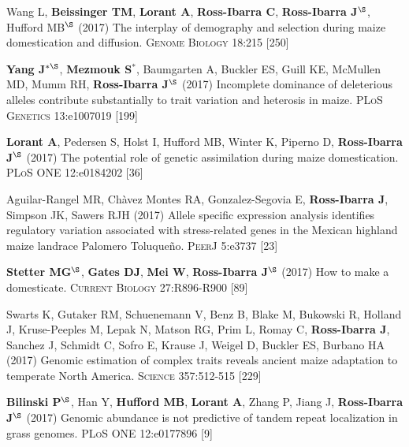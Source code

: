 \documentclass[letterpaper,10pt]{article}
\begin{document}
\begin{etaremune}
\item Wang L, \textbf{Beissinger TM}, \textbf{Lorant A}, \textbf{Ross-Ibarra C}, \textbf{Ross-Ibarra J}$^\S$, Hufford MB$^\S$ (2017) The interplay of demography and selection during maize domestication and diffusion. \textsc{Genome Biology} 18:215
{} [250]\\

\item {\bf Yang J}$^{*\S}$, {\bf Mezmouk S}$^*$, Baumgarten A, Buckler ES, Guill KE, McMullen MD, Mumm RH, {\bf Ross-Ibarra J}$^\S$ (2017) Incomplete dominance of deleterious alleles contribute substantially to trait variation and heterosis in maize. \textsc{PLoS Genetics} 13:e1007019
{} [199]\\

\item \textbf{Lorant A}, Pedersen S, Holst I, Hufford MB, Winter K, Piperno D, \textbf{Ross-Ibarra J}$^\S$ (2017) The potential role of genetic assimilation during maize domestication. \textsc{PLoS ONE} 12:e0184202
{} [36]\\

\item Aguilar-Rangel MR, Ch\`{a}vez Montes RA,  Gonzalez-Segovia E, \textbf{Ross-Ibarra J}, Simpson JK, Sawers RJH (2017) Allele specific expression analysis identifies regulatory variation associated with stress-related genes in the Mexican highland maize landrace Palomero Toluque\~{n}o. \textsc{PeerJ} 5:e3737
{} [23]\\

\item   {\bf Stetter MG}$^\S$, {\bf Gates DJ}, {\bf Mei W}, {\bf Ross-Ibarra J}$^\S$ (2017) How to make a domesticate. \textsc{Current Biology} 27:R896-R900
{} [89]\\

\item Swarts K, Gutaker RM,   Schuenemann V,  Benz B,  Blake M, Bukowski R, Holland J, Kruse-Peeples M, Lepak N, Matson RG, Prim L, Romay C, {\bf Ross-Ibarra J}, Sanchez J, Schmidt C,  Sofro E,  Krause J,  Weigel D,  Buckler ES,  Burbano HA (2017) Genomic estimation of complex traits reveals ancient maize adaptation to temperate North America. \textsc{Science} 357:512-515
{} [229]\\

\item {\bf Bilinski P}$^\S$, Han Y, {\bf Hufford MB}, {\bf Lorant A}, Zhang P, Jiang J, {\bf Ross-Ibarra J}$^\S$ (2017) Genomic abundance is not predictive of tandem repeat localization in grass genomes. \textsc{PLoS ONE} 12:e0177896
{} [9]\\


\end{etaremune}
\end{document}
